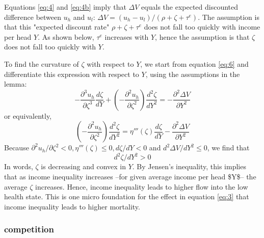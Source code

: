 \documentclass[12pt,english,a4paper]{article}
\begin{document}
Equations \eqref{eq:4} and \eqref{eq:4b} imply that \(\Delta V\) equals the expected discounted difference between \(u_h\) and \(u_l\): \(\Delta V = (u_h-u_l)/(\rho+\zeta+\tau^e)\). The assumption is that this "expected discount rate" \(\rho+\zeta+\tau^e\) does not fall too quickly with income per head \(Y\). As shown below, \(\tau^e\) increases with \(Y\), hence the assumption is that \(\zeta\) does not fall too quickly with \(Y\).

To find the curvature of \(\zeta\) with respect to \(Y\), we start from equation \eqref{eq:6} and differentiate this expression with respect to \(Y\), using the assumptions in the lemma:
\begin{equation}
\label{eq:33}
-\frac{\partial^3 u_h}{\partial \zeta^3} \frac{d\zeta}{dY} + \left(-\frac{\partial^2 u_h}{\partial \zeta^2} \right) \frac{d^2 \zeta}{dY^2} = - \frac{\partial^2 \Delta V}{\partial Y^2}
\end{equation}
or equivalently,
\begin{equation}
\label{eq:34}
 \left(-\frac{\partial^2 u_h}{\partial \zeta^2} \right) \frac{d^2 \zeta}{dY^2} = \eta'''(\zeta) \frac{d\zeta}{dY} - \frac{\partial^2 \Delta V}{\partial Y^2}
\end{equation}
Because \(\partial^2 u_h/\partial \zeta^2 <0, \eta'''(\zeta) \leq 0, d\zeta/dY < 0\) and \(d^2 \Delta V/dY^2 \leq 0\), we find that
\begin{equation}
\label{eq:30}
d^2 \zeta/dY^2 >0
\end{equation}
In words, \(\zeta\) is decreasing and convex in \(Y\). By Jensen's inequality, this implies that as income inequality increases --for given average income per head \$Y\$-- the average \(\zeta\) increases. Hence, income inequality leads to higher flow into the low health state. This is one micro foundation for the effect in equation \eqref{eq:3} that income inequality leads to higher mortality.


\subsubsection{competition}
\label{sec:org5c7c92f}
\end{document}
